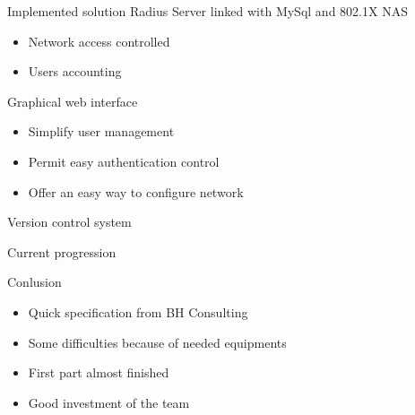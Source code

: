 \documentclass[12pt]{beamer}
\begin{document}
\begin{frame}{Implemented solution}
    Radius Server linked with MySql and 802.1X NAS
    \begin{itemize}
	\item Network access controlled
	\item Users accounting
    \end{itemize}
    \vfill
    Graphical web interface
    \begin{itemize}
	\item<1-> Simplify user management
	\item<2-> Permit easy authentication control
	\item<3-> Offer an easy way to configure network
    \end{itemize}
    \vfill
    Version control system
\end{frame}

\begin{frame}{Current progression}
\end{frame}


\begin{frame}{Conlusion}
    \begin{itemize}
	\item<1->Quick specification from BH Consulting
	\vfill
	\item<2->Some difficulties because of needed equipments
	\vfill
	\item<3->First part almost finished
	\vfill
	\item<4->Good investment of the team
    \end{itemize}
\end{frame}
\end{document}
